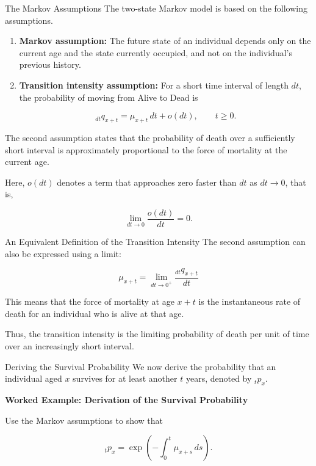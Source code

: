\documentclass[
  ignorenonframetext,
  aspectratio=169,
]{beamer}
\begin{document}
\begin{frame}{The Markov Assumptions}
\protect{}\label{the-markov-assumptions}
The two-state Markov model is based on the following assumptions.

\begin{enumerate}
\item
  \textbf{Markov assumption:} The future state of an individual depends
  only on the current age and the state currently occupied, and not on
  the individual's previous history.
\item
  \textbf{Transition intensity assumption:} For a short time interval of
  length \(dt\), the probability of moving from Alive to Dead is

  \[
  {}_{dt}q_{x+t}
  =\mu_{x+t}\,dt+o(dt),
  \qquad t\geq 0.
  \]
\end{enumerate}

The second assumption states that the probability of death over a
sufficiently short interval is approximately proportional to the force
of mortality at the current age.

Here, \(o(dt)\) denotes a term that approaches zero faster than \(dt\)
as \(dt\to 0\), that is,

\[
\lim_{dt\to 0}\frac{o(dt)}{dt}=0.
\]
\end{frame}

\begin{frame}{An Equivalent Definition of the Transition Intensity}
\protect{}\label{an-equivalent-definition-of-the-transition-intensity}
The second assumption can also be expressed using a limit:

\[
\boxed{
\mu_{x+t}
=
\lim_{dt\to 0^+}
\frac{{}_{dt}q_{x+t}}{dt}
}
\]

This means that the force of mortality at age \(x+t\) is the
instantaneous rate of death for an individual who is alive at that age.

Thus, the transition intensity is the limiting probability of death per
unit of time over an increasingly short interval.
\end{frame}

\begin{frame}{Deriving the Survival Probability}
\protect{}\label{deriving-the-survival-probability}
We now derive the probability that an individual aged \(x\) survives for
at least another \(t\) years, denoted by \({}_tp_x\).

\textbf{Worked Example: Derivation of the Survival Probability}

Use the Markov assumptions to show that

\[
{}_tp_x
=
\exp\left(-\int_0^t\mu_{x+s}\,ds\right).
\]
\end{frame}
\end{document}
